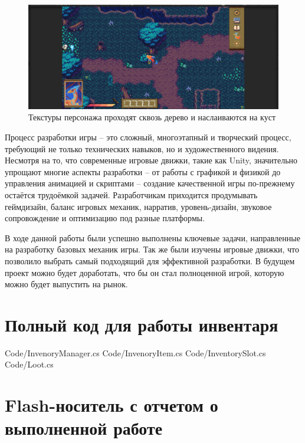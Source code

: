 \documentclass[bachelor, och, coursework, times]{SCWorks}
\begin{document}
     \begin{figure} [H]
        \centering
    \includegraphics[width=0.50\linewidth]{Pictures/Снимок экрана 2025-06-25 213248.png}
    \caption{Текстуры персонажа проходят сквозь дерево и наслаиваются на куст}
    \label{fig:Bug}
    \end{figure}





\conclusion

   Процесс разработки игры – это сложный, многоэтапный и творческий процесс, 
   требующий не только технических навыков,
    но и художественного видения. 
    Несмотря на то, что современные игровые движки, 
    такие как Unity, значительно упрощают многие аспекты разработки – от работы с графикой и физикой 
    до управления анимацией и скриптами – создание качественной игры по-прежнему 
    остаётся трудоёмкой задачей. Разработчикам приходится продумывать геймдизайн, 
    баланс игровых механик, нарратив, уровень-дизайн, 
    звуковое сопровождение и оптимизацию под разные платформы.

    В ходе данной работы были успешно выполнены ключевые задачи, направленные на разработку базовых
    механик игры. Так же были изучены игровые движки, что позволило
    выбрать самый подходящий для эффективной разработки.
     В будущем проект можно будет доработать, что бы он стал полноценной игрой,
    которую можно будет выпустить на рынок.  



    
    
    
    \appendix

    \section{Полный код для работы инвентаря}
     {Code/InvenoryManager.cs} 
     {Code/InvenoryItem.cs}
     {Code/InventorySlot.cs}
     {Code/Loot.cs}

    \section{Flash-носитель с отчетом о выполненной работе}
\end{document}
